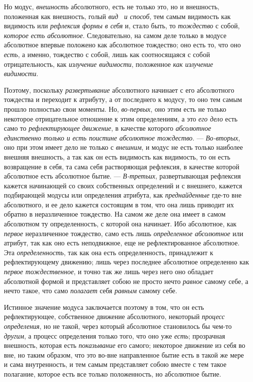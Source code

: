 Но модус, {\em внешность} абсолютного, есть не только
это, но и внешность, положенная как внешность, голый
{\em вид \ и способ}, тем самым видимость как видимость
или {\em рефлексия формы в себя} и, стало быть, то
{\em тождество} с собой,
{\em которое есть абсолютное}. Следовательно, на самом
деле только в модусе абсолютное впервые положено как абсолютное тождество;
оно есть то, что оно {\em есть}, а именно, тождество с
собой, лишь как соотносящаяся с собой отрицательность, как
{\em излучение видимости}, положенное
{\em как излучение видимости}.

Поэтому, поскольку {\em развертывание} абсолютного
начинает с его абсолютного тождества и переходит к атрибуту, а от
последнего к модусу, то оно тем самым прошло полностью свои моменты. Но,
{\em во-первых}, оно этим есть не только некоторое
отрицательное отношение к этим определениям, а это
{\em его дело} есть само то
{\em рефлектирующее движение}, в качестве которого
{\em абсолютное единственно только и есть поистине
абсолютное тождество}. — {\em Во-вторых}, оно при этом
имеет дело не только с {\em внешним}, и модус не есть
только наиболее внешняя внешность, а так как он есть видимость как
видимость, то он есть возвращение в себя, та сама себя растворяющая
рефлексия, в качестве которой абсолютное есть абсолютное бытие. —
{\em В-третьих}, развертывающая рефлексия кажется
начинающей со своих собственных определений и с внешнего, кажется
подбирающей модусы или определения атрибута, как
{\em преднайденные} где-то вне абсолютного, и ее дело
кажется состоящим в том, что она лишь приводит их обратно в неразличенное
тождество. На самом же деле она имеет в самом абсолютном ту определенность,
с которой она начинает. Ибо абсолютное, как
{\em первое} неразличенное тождество, само есть лишь
{\em определенное абсолютное} или атрибут, так как оно
есть неподвижное, еще не рефлектированное абсолютное. Эта
{\em определенность}, так как она есть определенность,
принадлежит к рефлектирующему движению; лишь через последнее абсолютное
определенно как {\em первое тождественное}, и точно так
же лишь через него оно обладает абсолютной формой и представляет собою не
просто нечто {\em равное} самому себе, а нечто такое,
что само {\em полагает} себя
{\em равным} самому себе.

Истинное значение модуса заключается поэтому в том, что он есть
рефлектирующее, собственное движение абсолютного, некоторый
{\em процесс определения}, но не такой, через который
абсолютное становилось бы чем-то {\em другим}, а
процесс определения только того, что оно уже
{\em есть}; прозрачная внешность, которая есть
{\em показывание} его самого; некоторое движение из
себя во вне, но таким образом, что это во-вне направленное бытие есть в
такой же мере и сама внутренность, и тем самым представляет собою вместе с
тем такое полагание, которое есть все только положенность, но абсолютное
бытие.


